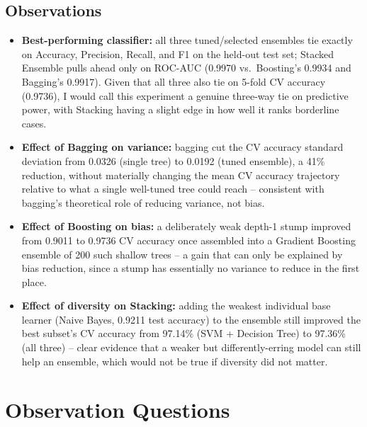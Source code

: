 \documentclass[11pt,a4paper]{article}
\begin{document}
\subsection{Observations}
\begin{itemize}[nosep]
  \item \textbf{Best-performing classifier:} all three tuned/selected ensembles tie exactly on Accuracy, Precision, Recall, and F1 on the held-out test set; Stacked Ensemble pulls ahead only on ROC-AUC (0.9970 vs.\ Boosting's 0.9934 and Bagging's 0.9917). Given that all three also tie on 5-fold CV accuracy (0.9736), I would call this experiment a genuine three-way tie on predictive power, with Stacking having a slight edge in how well it ranks borderline cases.
  \item \textbf{Effect of Bagging on variance:} bagging cut the CV accuracy standard deviation from 0.0326 (single tree) to 0.0192 (tuned ensemble), a 41\% reduction, without materially changing the mean CV accuracy trajectory relative to what a single well-tuned tree could reach -- consistent with bagging's theoretical role of reducing variance, not bias.
  \item \textbf{Effect of Boosting on bias:} a deliberately weak depth-1 stump improved from 0.9011 to 0.9736 CV accuracy once assembled into a Gradient Boosting ensemble of 200 such shallow trees -- a gain that can only be explained by bias reduction, since a stump has essentially no variance to reduce in the first place.
  \item \textbf{Effect of diversity on Stacking:} adding the weakest individual base learner (Naive Bayes, 0.9211 test accuracy) to the ensemble still improved the best subset's CV accuracy from 97.14\% (SVM + Decision Tree) to 97.36\% (all three) -- clear evidence that a weaker but differently-erring model can still help an ensemble, which would not be true if diversity did not matter.
\end{itemize}

\section{Observation Questions}
\end{document}
